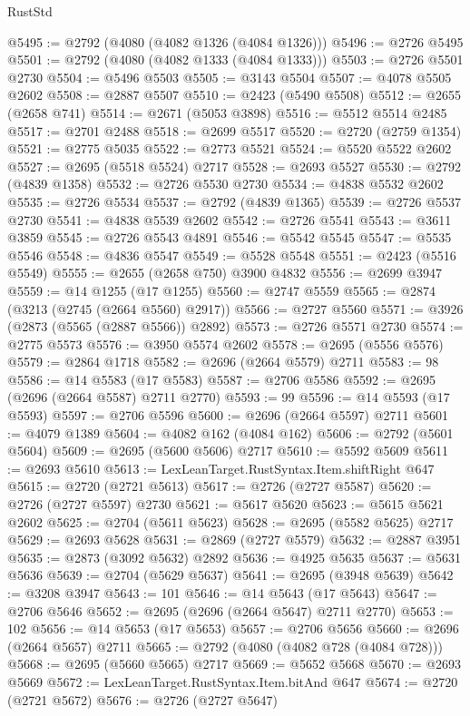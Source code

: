\begin{lexlean}{RustStd}
\begin{coremodule}
@5495 := @2792 (@4080 (@4082 @1326 (@4084 @1326)))
@5496 := @2726 @5495
@5501 := @2792 (@4080 (@4082 @1333 (@4084 @1333)))
@5503 := @2726 @5501 @2730
@5504 := @5496 @5503
@5505 := @3143 @5504
@5507 := @4078 @5505 @2602
@5508 := @2887 @5507
@5510 := @2423 (@5490 @5508)
@5512 := @2655 (@2658 @741)
@5514 := @2671 (@5053 @3898)
@5516 := @5512 @5514 @2485
@5517 := @2701 @2488
@5518 := @2699 @5517
@5520 := @2720 (@2759 @1354)
@5521 := @2775 @5035
@5522 := @2773 @5521
@5524 := @5520 @5522 @2602
@5527 := @2695 (@5518 @5524) @2717
@5528 := @2693 @5527
@5530 := @2792 (@4839 @1358)
@5532 := @2726 @5530 @2730
@5534 := @4838 @5532 @2602
@5535 := @2726 @5534
@5537 := @2792 (@4839 @1365)
@5539 := @2726 @5537 @2730
@5541 := @4838 @5539 @2602
@5542 := @2726 @5541
@5543 := @3611 @3859
@5545 := @2726 @5543 @4891
@5546 := @5542 @5545
@5547 := @5535 @5546
@5548 := @4836 @5547
@5549 := @5528 @5548
@5551 := @2423 (@5516 @5549)
@5555 := @2655 (@2658 @750) @3900 @4832
@5556 := @2699 @3947
@5559 := @14 @1255 (@17 @1255)
@5560 := @2747 @5559
@5565 := @2874 (@3213 (@2745 (@2664 @5560) @2917))
@5566 := @2727 @5560
@5571 := @3926 (@2873 (@5565 (@2887 @5566)) @2892)
@5573 := @2726 @5571 @2730
@5574 := @2775 @5573
@5576 := @3950 @5574 @2602
@5578 := @2695 (@5556 @5576)
@5579 := @2864 @1718
@5582 := @2696 (@2664 @5579) @2711
@5583 := 98
@5586 := @14 @5583 (@17 @5583)
@5587 := @2706 @5586
@5592 := @2695 (@2696 (@2664 @5587) @2711 @2770)
@5593 := 99
@5596 := @14 @5593 (@17 @5593)
@5597 := @2706 @5596
@5600 := @2696 (@2664 @5597) @2711
@5601 := @4079 @1389
@5604 := @4082 @162 (@4084 @162)
@5606 := @2792 (@5601 @5604)
@5609 := @2695 (@5600 @5606) @2717
@5610 := @5592 @5609
@5611 := @2693 @5610
@5613 := LexLeanTarget.RustSyntax.Item.shiftRight @647
@5615 := @2720 (@2721 @5613)
@5617 := @2726 (@2727 @5587)
@5620 := @2726 (@2727 @5597) @2730
@5621 := @5617 @5620
@5623 := @5615 @5621 @2602
@5625 := @2704 (@5611 @5623)
@5628 := @2695 (@5582 @5625) @2717
@5629 := @2693 @5628
@5631 := @2869 (@2727 @5579)
@5632 := @2887 @3951
@5635 := @2873 (@3092 @5632) @2892
@5636 := @4925 @5635
@5637 := @5631 @5636
@5639 := @2704 (@5629 @5637)
@5641 := @2695 (@3948 @5639)
@5642 := @3208 @3947
@5643 := 101
@5646 := @14 @5643 (@17 @5643)
@5647 := @2706 @5646
@5652 := @2695 (@2696 (@2664 @5647) @2711 @2770)
@5653 := 102
@5656 := @14 @5653 (@17 @5653)
@5657 := @2706 @5656
@5660 := @2696 (@2664 @5657) @2711
@5665 := @2792 (@4080 (@4082 @728 (@4084 @728)))
@5668 := @2695 (@5660 @5665) @2717
@5669 := @5652 @5668
@5670 := @2693 @5669
@5672 := LexLeanTarget.RustSyntax.Item.bitAnd @647
@5674 := @2720 (@2721 @5672)
@5676 := @2726 (@2727 @5647)

\end{coremodule}
\end{lexlean}
